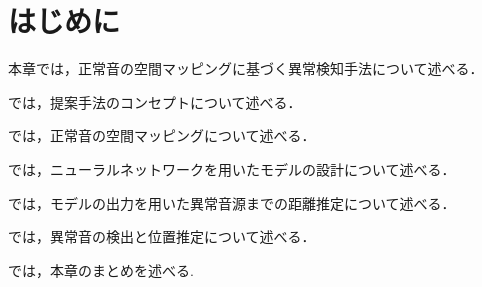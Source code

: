 \documentclass[../main]{subfiles}
\begin{document}
\section{はじめに}
\label{sec:pmethod_introduction}

本章では，正常音の空間マッピングに基づく異常検知手法について述べる．

では，提案手法のコンセプトについて述べる．

では，正常音の空間マッピングについて述べる．

では，ニューラルネットワークを用いたモデルの設計について述べる．

では，モデルの出力を用いた異常音源までの距離推定について述べる．

では，異常音の検出と位置推定について述べる．

では，本章のまとめを述べる.
\end{document}
